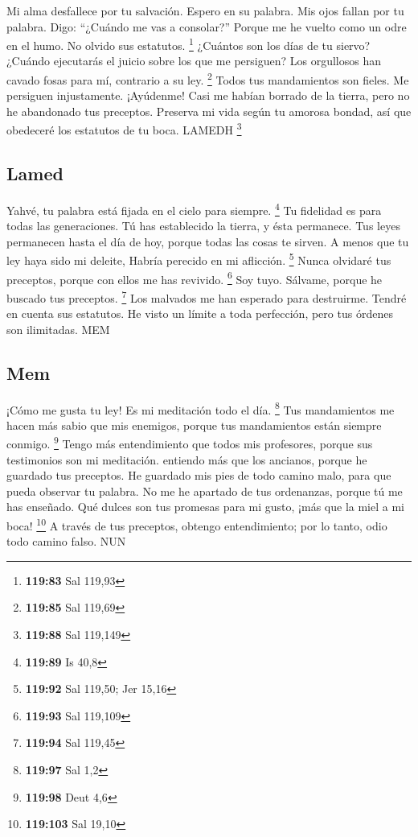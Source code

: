 \begin{paracol}{2}
 Mi alma desfallece por tu salvación. Espero en su
palabra.  Mis ojos fallan por tu palabra. Digo: ``¿Cuándo
me vas a consolar?''  Porque me he vuelto como un odre en
el humo. No olvido sus estatutos. \footnote{\textbf{119:83} Sal 119,93}
 ¿Cuántos son los días de tu siervo? ¿Cuándo ejecutarás
el juicio sobre los que me persiguen?  Los orgullosos han
cavado fosas para mí, contrario a su ley. \footnote{\textbf{119:85} Sal
  119,69}  Todos tus mandamientos son fieles. Me
persiguen injustamente. ¡Ayúdenme!  Casi me habían
borrado de la tierra, pero no he abandonado tus preceptos.
 Preserva mi vida según tu amorosa bondad, así que
obedeceré los estatutos de tu boca. LAMEDH \footnote{\textbf{119:88} Sal
  119,149}

\hypertarget{lamed}{%
\subsection{Lamed}\label{lamed}}

 Yahvé, tu palabra está fijada en el cielo para siempre.
\footnote{\textbf{119:89} Is 40,8}  Tu fidelidad es para
todas las generaciones. Tú has establecido la tierra, y ésta permanece.
 Tus leyes permanecen hasta el día de hoy, porque todas
las cosas te sirven.  A menos que tu ley haya sido mi
deleite, Habría perecido en mi aflicción. \footnote{\textbf{119:92} Sal
  119,50; Jer 15,16}  Nunca olvidaré tus preceptos,
porque con ellos me has revivido. \footnote{\textbf{119:93} Sal 119,109}
 Soy tuyo. Sálvame, porque he buscado tus preceptos.
\footnote{\textbf{119:94} Sal 119,45}  Los malvados me
han esperado para destruirme. Tendré en cuenta sus estatutos.
 He visto un límite a toda perfección, pero tus órdenes
son ilimitadas. MEM

\hypertarget{mem}{%
\subsection{Mem}\label{mem}}

 ¡Cómo me gusta tu ley! Es mi meditación todo el día.
\footnote{\textbf{119:97} Sal 1,2}  Tus mandamientos me
hacen más sabio que mis enemigos, porque tus mandamientos están siempre
conmigo. \footnote{\textbf{119:98} Deut 4,6}  Tengo más
entendimiento que todos mis profesores, porque sus testimonios son mi
meditación.  entiendo más que los ancianos, porque he
guardado tus preceptos.  He guardado mis pies de todo
camino malo, para que pueda observar tu palabra.  No me
he apartado de tus ordenanzas, porque tú me has enseñado.
 Qué dulces son tus promesas para mi gusto, ¡más que la
miel a mi boca! \footnote{\textbf{119:103} Sal 19,10}  A
través de tus preceptos, obtengo entendimiento; por lo tanto, odio todo
camino falso. NUN


\end{paracol}

